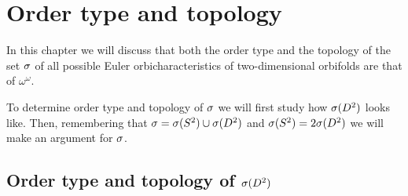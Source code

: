 \chapter{Order type and topology}\label{order structure}
%
%
%

In this chapter we will discuss that both the order type and the topology 
of the set ${\sigma}$ of all possible Euler orbicharacteristics 
of two-dimensional orbifolds are that of $\omega^\omega$. 



To determine order type and topology of ${\sigma}$ we will first study how ${{\sigma}(D^2)}$ looks like. 
Then, remembering that 
${\sigma} = {{\sigma}(S^2)} \cup {{\sigma}(D^2)}$ and ${{\sigma}(S^2)} = 2{{\sigma}(D^2)}$ we will make an argument for ${\sigma}$. 








\section{Order type and topology of ${{\sigma}(D^2)}$}


